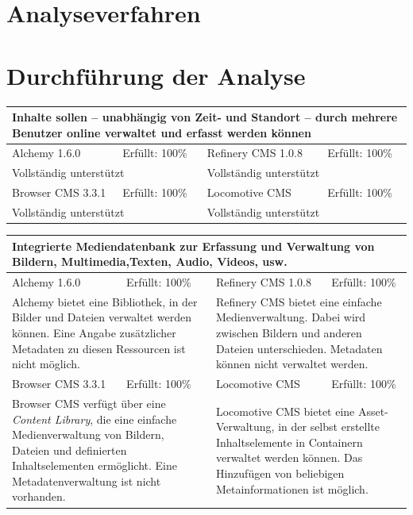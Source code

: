 \newpage
\center
\section{Analyseverfahren}
\section{Durchführung der Analyse}
\begin{tabular}[!ht]{|l|l|l|l|}
\hline
\multicolumn{4}{|p{15cm}|}{\textbf{Inhalte sollen – unabhängig von Zeit- und Standort – durch mehrere Benutzer online verwaltet und erfasst werden können}} \\
\hline
  Alchemy 1.6.0 & \cellcolor{green}Erfüllt: 100\% & Refinery CMS 1.0.8 & \cellcolor{green}Erfüllt: 100\% \\
  \hline
  \multicolumn{2}{|p{7.5cm}|}{Vollständig unterstützt} & \multicolumn{2}{p{7.5cm}|}{Vollständig unterstützt} \\
  \hline
  Browser CMS 3.3.1 & \cellcolor{green}Erfüllt: 100\% & Locomotive CMS & \cellcolor{green}Erfüllt: 100\% \\
  \hline
  \multicolumn{2}{|p{7.5cm}|}{Vollständig unterstützt} & \multicolumn{2}{p{7.5cm}|}{Vollständig unterstützt} \\
\hline
\end{tabular}
\newline
\newline
\newline
\begin{tabular}[!ht]{|l|l|l|l|}
\hline
\multicolumn{4}{|p{15cm}|}{\textbf{Integrierte Mediendatenbank zur Erfassung und Verwaltung von Bildern, Multimedia,Texten, Audio, Videos, usw.}} \\
\hline
  Alchemy 1.6.0 & \cellcolor{green}Erfüllt: 100\% & Refinery CMS 1.0.8 & \cellcolor{green}Erfüllt: 100\% \\
  \hline
  \multicolumn{2}{|p{7.5cm}|}{Alchemy bietet eine Bibliothek, in der Bilder und Dateien verwaltet werden können. Eine Angabe zusätzlicher Metadaten zu diesen Ressourcen ist nicht möglich.}
   & \multicolumn{2}{p{7.5cm}|}{Refinery CMS bietet eine einfache Medienverwaltung. Dabei wird zwischen Bildern und anderen Dateien unterschieden. Metadaten können nicht verwaltet werden.} \\
  \hline
  Browser CMS 3.3.1 & \cellcolor{green}Erfüllt: 100\% & Locomotive CMS & \cellcolor{green}Erfüllt: 100\% \\
  \hline
  \multicolumn{2}{|p{7.5cm}|}{Browser CMS verfügt über eine \emph {Content Library}, die eine einfache Medienverwaltung von Bildern, Dateien und definierten Inhaltselementen ermöglicht. Eine Metadatenverwaltung ist nicht vorhanden.} & \multicolumn{2}{p{7.5cm}|}{Locomotive CMS bietet eine Asset-Verwaltung, in der selbst erstellte Inhaltselemente in Containern verwaltet werden können. Das Hinzufügen von beliebigen Metainformationen ist möglich.} \\
\hline
\end{tabular}
